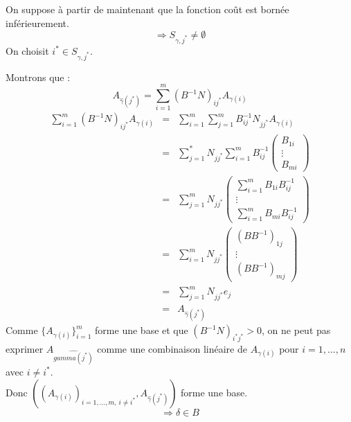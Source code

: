 On suppose à partir de maintenant que la fonction coût est bornée inférieurement.
	\[\Rightarrow S_{\gamma,j^*}\neq \emptyset\]
On choisit $i^*\in S_{\gamma,j^*}$.


\begin{dem}
Montrons que :
	\[A_{\hat{\gamma}(j^*)}=\sum_{i=1}^m (B^{-1}N)_{ij^*}A_{\gamma(i)}\]
\begin{eqnarray*}
	\sum_{i=1}^m (B^{-1}N)_{ij^*}A_{\gamma(i)}&=&\sum_{i=1}^m \sum_{j=1}^m B^{-1}_{ij}N_{jj^*}A_{\gamma(i)}\\
			&=&\sum_{j=1}^* N_{jj^*} \sum_{i=1}^m B^{-1}_{ij}\begin{pmatrix} B_{1i}\\ \vdots \\ B_{mi} \end{pmatrix} \\
			&=&\sum_{j=1}^m N_{jj^*} \begin{pmatrix} \sum_{i=1}^m B_{1i}B^{-1}_{ij} \\ \vdots \\ \sum_{i=1}^m B_{mi}B^{-1}_{ij} \end{pmatrix} \\
			&=&\sum_{i=1}^m N_{jj^*} \begin{pmatrix} (BB^{-1})_{1j} \\ \vdots \\ (BB^{-1})_{mj} \end{pmatrix}\\
			&=&\sum_{j=1}^m N_{jj^*}e_j \\
			&=&A_{\hat{\gamma}(j^*)}
\end{eqnarray*}
Comme $\{A_{\gamma(i)}\}_{i=1}^m$ forme une base et que $(B^{-1}N)_{i^*j^*}>0$, on ne peut pas exprimer $A_{\hat{gamma(j^*)}}$ comme une combinaison linéaire de $A_{\gamma(i)}$ pour $i=1,...,n$ avec $i\neq i^*$. \\
Donc $((A_{\gamma(i)})_{i=1,...,m,\ i\neq i^*},A_{\hat{\gamma}(j^*)})$ forme une base.
	\[\Rightarrow \delta \in B\]
\end{dem}



